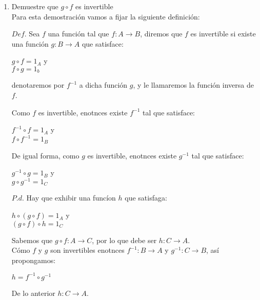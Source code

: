 \documentclass[12pt]{article}
\begin{document}
\begin{enumerate}[label=\alph*)]
    \item Demuestre que ${\displaystyle g \circ f}$ es invertible\\

    Para esta demostración vamos a fijar la siguiente definición:

    \begin{tcolorbox}[title=\textbf{Definiciones}, colback=blue!15!white, colframe=black!, breakable]

    $Def$. Sea $f$ una función tal que $f: A \longrightarrow B$, diremos que $f$ es invertible si existe una función 
    $g: B \longrightarrow A$ que satisface:
\begin{center}
    $g \circ f = 1_A$ y\\

    $f \circ g = 1_b$ 
\end{center}

    denotaremos por $f^{-1}$ a dicha función $g$, y le llamaremos la función inversa de $f$.
    \end{tcolorbox}

    Como $f$ es invertible, enotnces existe $f^{-1}$ tal que satisface:
    \begin{center}
        $f^{-1} \circ f = 1_A$ y\\
         $f \circ f^{-1} = 1_B$
    \end{center}
    De igual forma, como $g$ es invertible, enotnces existe $g^{-1}$ tal que satisface:
    \begin{center}
        $g^{-1} \circ g = 1_B$ y\\
         $g \circ g^{-1} = 1_C$
    \end{center}
    $P.d$. Hay que exhibir una funcíon $h$ que satisfaga: 
    \begin{center}
        $h \circ (g \circ f) = 1_A$ y\\
         $(g \circ f) \circ h = 1_C$
    \end{center}
    Sabemos que $g \circ f: A \longrightarrow C$, por lo que debe ser $h: C \longrightarrow A$.\\

    Cómo $f$ y $g$ son invertibles enotnces $f^{-1}: B \longrightarrow A$ y $g^{-1}: C \longrightarrow B$, así propongamos:
    \begin{center}
        $h = f^{-1} \circ g^{-1}$
    \end{center}
    De lo anterior $h: C \longrightarrow A$.\\


\end{enumerate}
\end{document}
